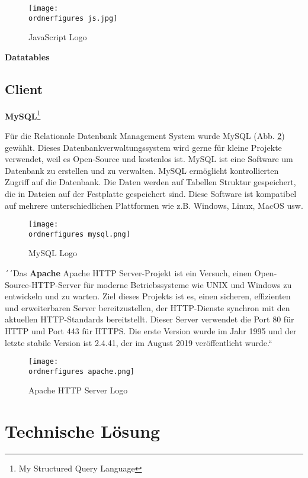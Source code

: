 \begin{figure}[h!]
	\centering
	\texttt{[image: \\ordnerfigures js.jpg]}
	\caption{JavaScript Logo}
	\label{fi:js}
\end{figure}



\textbf{Datatables}


\subsection{Client}

\textbf{MySQL}\footnote{My Structured Query Language}

F\"{u}r die Relationale Datenbank Management System wurde MySQL (Abb. \ref{fi:mysql}) gew\"{a}hlt. Dieses Datenbankverwaltungssystem wird gerne f\"{u}r kleine Projekte verwendet, weil es Open-Source und kostenlos ist. MySQL ist eine Software um Datenbank zu erstellen und zu verwalten. MySQL erm\"{o}glicht kontrollierten Zugriff auf die Datenbank. Die Daten werden auf Tabellen Struktur gespeichert, die in Dateien auf der Festplatte gespeichert sind. Diese Software ist kompatibel auf mehrere unterschiedlichen Plattformen wie z.B. Windows, Linux, MacOS usw.

\begin{figure}[h!]
	\centering
	\texttt{[image: \\ordnerfigures mysql.png]}
	\caption{MySQL Logo}
	\label{fi:mysql}
\end{figure}

´´Das \textbf{Apache} Apache HTTP Server-Projekt ist ein Versuch, einen Open-Source-HTTP-Server f\"{u}r moderne Betriebssysteme wie UNIX und Windows zu entwickeln und zu warten. Ziel dieses Projekts ist es, einen sicheren, effizienten und erweiterbaren Server bereitzustellen, der HTTP-Dienste synchron mit den aktuellen HTTP-Standards bereitstellt. Dieser Server verwendet die Port 80 f\"{u}r HTTP und Port 443 f\"{u}r HTTPS. Die erste Version wurde im Jahr 1995 und der letzte stabile Version ist 2.4.41, der im August 2019 ver\"{o}ffentlicht wurde.``\cite[Seite 4]{test}


\begin{figure}[h!]
	\centering
	\texttt{[image: \\ordnerfigures apache.png]}
	\caption{Apache HTTP Server Logo}
	\label{fi:apache}
\end{figure}

\section{Technische L\"osung}
